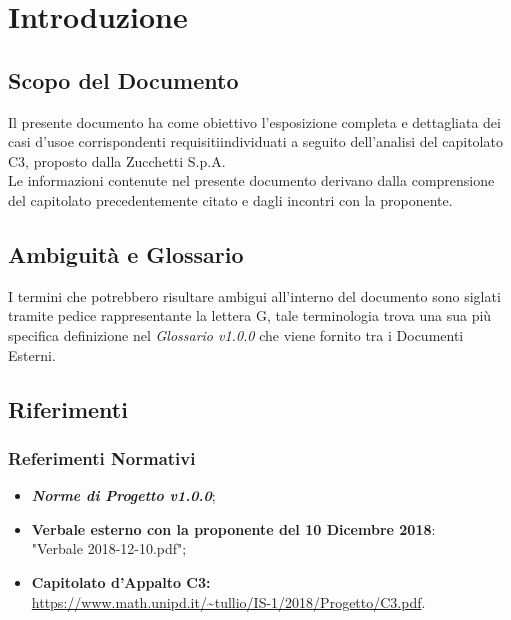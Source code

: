 \section{Introduzione}\label{Intro}

\subsection{Scopo del Documento}
Il presente documento ha come obiettivo l'esposizione completa e dettagliata dei casi d'uso\glossario e corrispondenti requisiti\glossario individuati a seguito dell'analisi del capitolato C3, proposto dalla Zucchetti S.p.A.\\
Le informazioni contenute nel presente documento derivano dalla comprensione del capitolato precedentemente citato e dagli incontri con la proponente.

\subsection{Ambiguità e Glossario}
I termini che potrebbero risultare ambigui all'interno del documento sono siglati tramite pedice rappresentante la lettera \textmd{G}, tale terminologia trova una sua più specifica definizione nel \textit{Glossario v1.0.0} che viene fornito tra i Documenti Esterni.

\subsection{Riferimenti}\label{Riferimenti}
\subsubsection{Referimenti Normativi}
\begin{itemize}
\item \textbf{\textit{Norme di Progetto v1.0.0}};
\item \textbf{Verbale esterno con la proponente del 10 Dicembre 2018}: \-\\ "Verbale 2018-12-10.pdf";
\item \textbf{Capitolato d'Appalto C3:}\\ \url{https://www.math.unipd.it/~tullio/IS-1/2018/Progetto/C3.pdf}.
\end{itemize}

